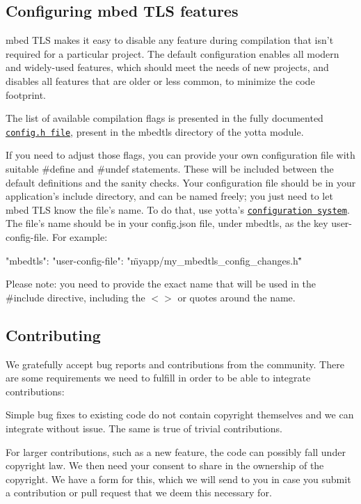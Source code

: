 \subsection*{Configuring mbed T\-L\-S features}

mbed T\-L\-S makes it easy to disable any feature during compilation that isn't required for a particular project. The default configuration enables all modern and widely-\/used features, which should meet the needs of new projects, and disables all features that are older or less common, to minimize the code footprint.

The list of available compilation flags is presented in the fully documented \href{https://github.com/ARMmbed/mbedtls/blob/development/include/mbedtls/config.h}{\tt config.\-h file}, present in the {\ttfamily mbedtls} directory of the yotta module.

If you need to adjust those flags, you can provide your own configuration file with suitable {\ttfamily \#define} and {\ttfamily \#undef} statements. These will be included between the default definitions and the sanity checks. Your configuration file should be in your application's {\ttfamily include} directory, and can be named freely; you just need to let mbed T\-L\-S know the file's name. To do that, use yotta's \href{http://docs.yottabuild.org/reference/config.html}{\tt configuration system}. The file's name should be in your {\ttfamily config.\-json} file, under mbedtls, as the key {\ttfamily user-\/config-\/file}. For example\-: \begin{DoxyVerb}{
   "mbedtls": {
      "user-config-file": "\"myapp/my_mbedtls_config_changes.h\""
   }
}
\end{DoxyVerb}


Please note\-: you need to provide the exact name that will be used in the {\ttfamily \#include} directive, including the {\ttfamily $<$$>$} or quotes around the name.

\subsection*{Contributing}

We gratefully accept bug reports and contributions from the community. There are some requirements we need to fulfill in order to be able to integrate contributions\-:
\begin{DoxyItemize}
\item Simple bug fixes to existing code do not contain copyright themselves and we can integrate without issue. The same is true of trivial contributions.
\item For larger contributions, such as a new feature, the code can possibly fall under copyright law. We then need your consent to share in the ownership of the copyright. We have a form for this, which we will send to you in case you submit a contribution or pull request that we deem this necessary for.
\end{DoxyItemize}

